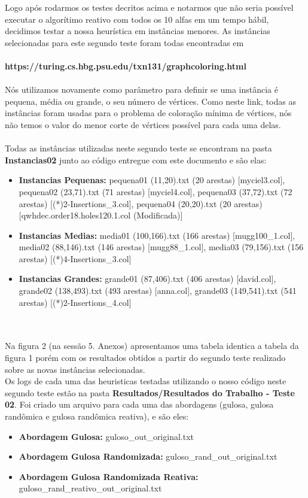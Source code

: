 \documentclass[a4paper, 12pt]{article}
\begin{document}
\ident Logo após rodarmos os testes decritos acima e notarmos que não seria possível executar o algorítimo reativo com todos os 10 alfas em um tempo hábil, decidimos testar a nossa heurística em instâncias menores. As instâncias selecionadas para este segundo teste foram todas encontradas em \\ \\ \textbf{https://turing.cs.hbg.psu.edu/txn131/graphcoloring.html} \\ \\Nós utilizamos novamente como parâmetro para definir se uma instância é pequena, média ou grande, o seu número de vértices. Como neste link, todas as instâncias foram usadas para o problema de coloração mínima de vértices, nós não temos o valor do menor corte de vértices possível para cada uma delas. 
\\ \\ \indent Todas as instâncias utilizadas neste segundo teste se encontram na pasta \textbf{Instancias02} junto ao código entregue com este documento e são elas:

\begin{itemize}
  \item \textbf{Instancias Pequenas:} pequena01 (11,20).txt (20 arestas) [myciel3.col], pequena02 (23,71).txt (71 arestas) [myciel4.col], pequena03 (37,72).txt (72 arestas) [(*)2-Insertions\_3.col], pequena04 (20,20).txt (20 arestas) [qwhdec.order18.holes120.1.col (Modificada)]
  \item \textbf{Instancias Medias:} media01 (100,166).txt (166 arestas) [mugg100\_1.col], media02 (88,146).txt (146 arestas) [mugg88\_1.col], media03 (79,156).txt (156 arestas) [(*)4-Insertions\_3.col]
  \item \textbf{Instancias Grandes:} grande01 (87,406).txt (406 arestas) [david.col], grande02 (138,493).txt (493 arestas) [anna.col], grande03 (149,541).txt (541 arestas) [(*)2-Insertions\_4.col]
\end{itemize}

\\ \\ \indent Na figura 2 (na sessão 5. Anexos) apresentamos uma tabela identica a tabela da figura 1 porém com os resultados obtidos a partir do segundo teste realizado sobre as novas instâncias selecionadas. \\

\indent Os logs de cada uma das heuristicas testadas utilizando o nosso código neste segundo teste estão na pasta \textbf{Resultados/Resultados do Trabalho - Teste 02}. Foi criado um arquivo para cada uma das abordagens (gulosa, gulosa randômica e gulosa randômica reativa), e são eles:
\begin{itemize}
  \item \textbf{Abordagem Gulosa:} guloso\_out\_original.txt
  \item \textbf{Abordagem Gulosa Randomizada:} guloso\_rand\_out\_original.txt
  \item \textbf{Abordagem Gulosa Randomizada Reativa:} guloso\_rand\_reativo\_out\_original.txt
\end{itemize}
\end{document}
